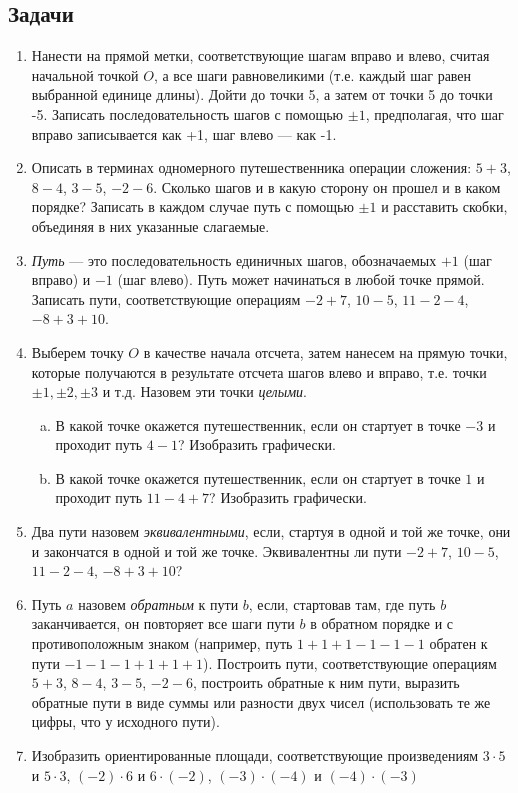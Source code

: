 \subsection*{Задачи}
\begin{enumerate}
\item Нанести на прямой метки, соответствующие шагам вправо и влево, считая начальной точкой $O$, а все шаги равновеликими (т.е. каждый шаг равен выбранной единице длины). Дойти до точки 5, а затем от точки 5 до точки -5. Записать последовательность шагов с помощью $\pm 1$, предполагая, что шаг вправо записывается как +1, шаг влево --- как -1.
\item Описать в терминах одномерного путешественника операции сложения: $5+3$, $8-4$, $3-5$, $-2-6$. Сколько шагов и в какую сторону он прошел и в каком порядке? Записать в каждом случае путь с помощью $\pm1$ и расставить скобки, объединяя в них указанные слагаемые.
\item \textit{Путь} --- это последовательность единичных шагов, обозначаемых $+1$ (шаг вправо) и $-1$ (шаг влево). Путь может начинаться в любой точке прямой.
Записать пути, соответствующие операциям $-2+7$, $10-5$, $11-2-4$, $-8+3+10$. 
\item Выберем точку $O$ в качестве начала отсчета, затем нанесем на прямую точки, которые получаются в результате отсчета шагов влево и вправо, т.е. точки $\pm1, \pm2, \pm3$ и т.д. Назовем эти точки \textit{целыми}.
\begin{enumerate}[a)]
\item В какой точке окажется путешественник, если он стартует в точке $-3$ и проходит путь $4-1$? Изобразить графически.
\item В какой точке окажется путешественник, если он стартует в точке $1$ и проходит путь $11-4+7$? Изобразить графически.
\end{enumerate}
\item Два пути назовем \textit{эквивалентными}, если, стартуя в одной и той же точке, они и закончатся в одной и той же точке. Эквивалентны ли пути $-2+7$, $10-5$, $11-2-4$, $-8+3+10$?
\item Путь $a$ назовем \textit{обратным} к пути $b$, если, стартовав там, где путь $b$ заканчивается, он повторяет все шаги пути $b$ в обратном порядке и с противоположным знаком (например, путь $1+1+1-1-1-1$ обратен к пути $-1-1-1+1+1+1$). Построить пути, соответствующие операциям $5+3$, $8-4$, $3-5$, $-2-6$, построить обратные к ним пути, выразить обратные пути в виде суммы или разности двух чисел (использовать те же цифры, что у исходного пути).
\item Изобразить ориентированные площади, соответствующие произведениям $3\cdot 5$ и $5\cdot 3$, $(-2)\cdot 6$ и $6\cdot (-2)$, $(-3)\cdot(-4)$ и $(-4)\cdot(-3)$
\end{enumerate}



